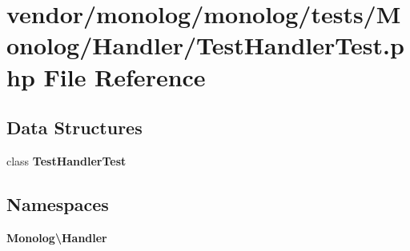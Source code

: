 \section{vendor/monolog/monolog/tests/\+Monolog/\+Handler/\+Test\+Handler\+Test.php File Reference}
\label{_test_handler_test_8php}
\subsection*{Data Structures}
\begin{DoxyCompactItemize}
\item 
class {\bf Test\+Handler\+Test}
\end{DoxyCompactItemize}
\subsection*{Namespaces}
\begin{DoxyCompactItemize}
\item 
 {\bf Monolog\textbackslash{}\+Handler}
\end{DoxyCompactItemize}
